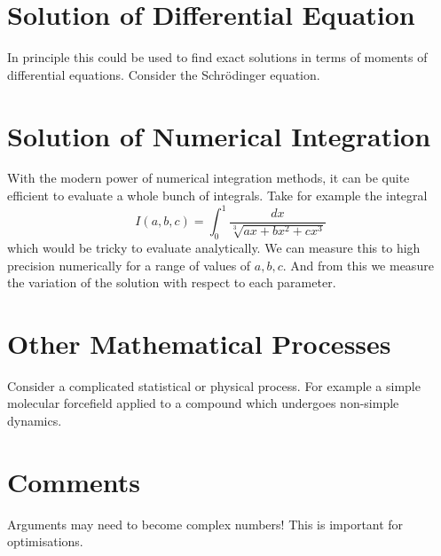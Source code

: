 \documentclass[journal=jcisd8,manuscript=article,layout=onecolumn,pdftex,floatfix,amsmath,amssymb,10pt]{achemso}
\begin{document}
\section{Solution of Differential Equation}
In principle this could be used to find exact solutions in terms of moments of differential equations. Consider the Schrödinger equation.

\section{Solution of Numerical Integration}
With the modern power of numerical integration methods, it can be quite efficient to evaluate a whole bunch of integrals. Take for example the integral
\begin{equation}
I(a,b,c) = \int_0^1 \frac{dx}{\sqrt[3]{a x + b x^2 + cx^3}}
\end{equation}
which would be tricky to evaluate analytically. We can measure this to high precision numerically for a range of  values of $a,b,c$. And from this we measure the variation of the solution with respect to each parameter.

\section{Other Mathematical Processes}
Consider a complicated statistical or physical process. For example a simple molecular forcefield applied to a compound which undergoes non-simple dynamics.


\section{Comments}
Arguments may need to become complex numbers! This is important for optimisations. 
\end{document}
